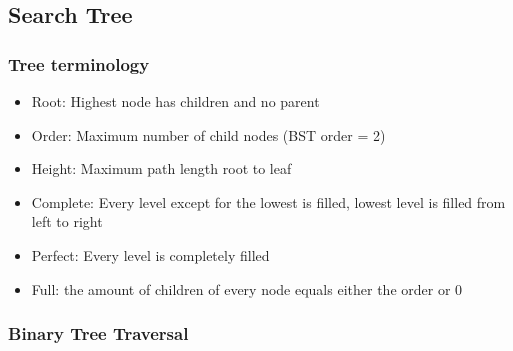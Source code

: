 \subsection{Search Tree}
    \subsubsection{Tree terminology}
        \begin{itemize}
            \item Root: Highest node has children and no parent
            \item Order: Maximum number of child nodes (BST order = 2)
            \item Height: Maximum path length root to leaf
            \item Complete: Every level except for the lowest is filled, lowest level is filled from left to right
            \item Perfect: Every level is completely filled
            \item Full: the amount of children of every node equals either the order or 0
        \end{itemize}
    
    \subsubsection{Binary Tree Traversal}

